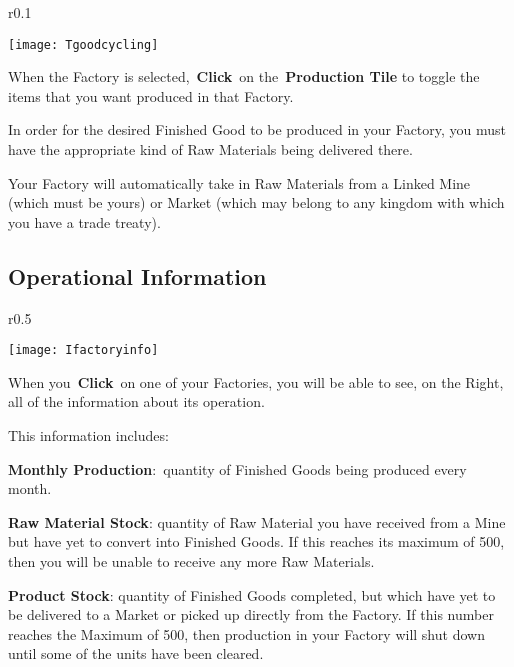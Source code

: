 
\begin{wrapfigure}{r}{0.1\textwidth}
	\vspace{-20pt}
	\begin{center}
		\texttt{[image: Tgoodcycling]}
	\end{center}
	\vspace{-20pt}
\end{wrapfigure}

When the Factory is selected, \textbf{Click} on the \textbf{Production Tile} to toggle the items that you want produced in that Factory.

In order for the desired Finished Good to be produced in your Factory, you must have the appropriate kind of Raw Materials being delivered there.

Your Factory will automatically take in Raw Materials from a Linked Mine (which must be yours) or Market (which may belong to any kingdom with which you have a trade treaty).

\subsection{Operational Information}


\begin{wrapfigure}{r}{0.5\textwidth}
	\vspace{-20pt}
	\begin{center}
		\texttt{[image: Ifactoryinfo]}
	\end{center}
	\vspace{-20pt}
\end{wrapfigure}

When you \textbf{Click} on one of your Factories, you will be able to see, on the Right, all of the information about its operation.

This information includes:

\textbf{Monthly Production}: quantity of Finished Goods being produced every month.

\textbf{Raw Material Stock}: quantity of Raw Material you have received from a Mine but have yet to convert into Finished Goods. If this reaches its maximum of 500, then you will be unable to receive any more Raw Materials.

\textbf{Product Stock}: quantity of Finished Goods completed, but which have yet to be delivered to a Market or picked up directly from the Factory. If this number reaches the Maximum of 500, then production in your Factory will shut down until some of the units have been cleared.

